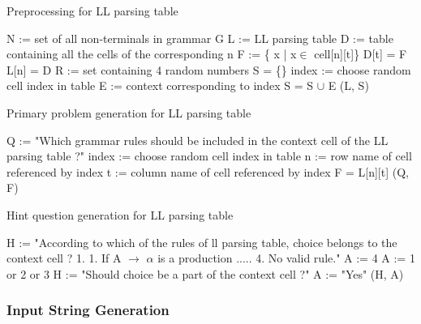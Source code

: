 \begin{algorithm}
\caption{Preprocessing for LL parsing table}
\label{algo:preprocessing-lltable}
\begin{algorithmic}[1]
\State N := set of all non-terminals in grammar G
\State L := LL parsing table 
\State D := table containing all the cells of the corresponding n
\State F := \{ x | x$\in$ cell[n][t]\}
\State D[t] = F
\EndFor
\State L[n] = D
\EndFor
\State R := set containing 4 random numbers
\State S = \{\}
\State index := choose random cell index in table
\State E := context corresponding to index
\State S = S $\cup$ E
\EndFor
\State \Return (L, S)
\EndFunction
\end{algorithmic}
\end{algorithm}

\begin{algorithm}
\caption{Primary problem generation for LL parsing table}
\label{algo:primary-lltable}
\begin{algorithmic}[1]
\State Q := "Which grammar rules should be included in the context cell of the LL parsing table ?"
\State index := choose random cell index in table
\State n := row name of cell referenced by index
\State t := column name of cell referenced by index
\State F = L[n][t]
\State \Return (Q, F)
\EndFunction
\end{algorithmic}
\end{algorithm}

\begin{algorithm}
\caption{Hint question generation for LL parsing table}
\label{algo:hint-lltable}
\begin{algorithmic}[1]
\State H := "According to which of the rules of ll parsing table, choice belongs to the context cell ? 1. 1. If A $\rightarrow$ $\alpha$ is a production ..... 4. No valid rule."
\State A := 4
\State A := 1 or 2 or 3
\EndIf
{}
\State H := "Should choice be a part of the context cell ?"
\State A := "Yes"
\EndIf
\State \Return (H, A)
\EndFunction
\end{algorithmic}
\end{algorithm}

\subsubsection{Input String Generation}
\label{ssec:inputgen}


